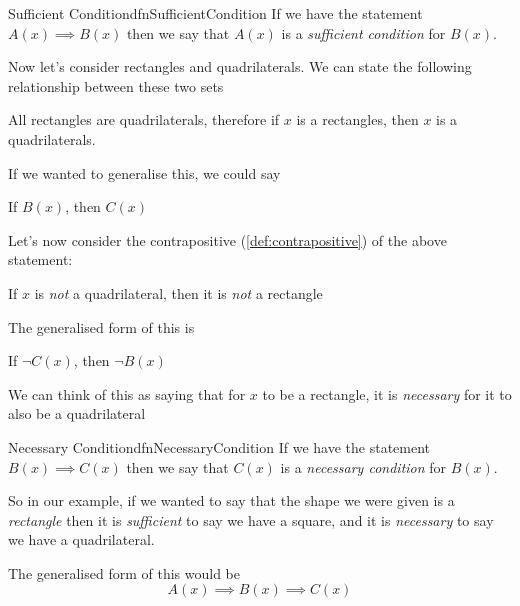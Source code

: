 \begin{dfn}[label={def:sufficentCondition}]{Sufficient Condition}{dfnSufficientCondition}
    If we have the statement $A(x) \implies B(x)$ then we say that $A(x)$ is a \emph{sufficient condition} for $B(x)$.
\end{dfn}

Now let's consider rectangles and quadrilaterals. We can state the following relationship between these two sets
\begin{center}
    All rectangles are quadrilaterals, therefore if $x$ is a rectangles, then $x$ is a quadrilaterals.
\end{center}

If we wanted to generalise this, we could say
\begin{center}
    If $B(x)$, then $C(x)$
\end{center}

Let's now consider the contrapositive (\cref{def:contrapositive}) of the above statement:
\begin{center}
    If $x$ is \emph{not} a quadrilateral, then it is \emph{not} a rectangle
\end{center}

The generalised form of this is
\begin{center}
    If $\lnot C(x)$, then $\lnot B(x)$
\end{center}

We can think of this as saying that for $x$ to be a rectangle, it is \emph{necessary} for it to also be a quadrilateral

\begin{dfn}[label={def:necessaryCondition}]{Necessary Condition}{dfnNecessaryCondition}
    If we have the statement $B(x) \implies C(x)$ then we say that $C(x)$ is a \emph{necessary condition} for $B(x)$.
\end{dfn}

So in our example, if we wanted to say that the shape we were given is a \emph{rectangle} then it is \emph{sufficient} to say we have a square, and it is \emph{necessary} to say we have a quadrilateral.

The generalised form of this would be
$$A(x) \implies B(x) \implies C(x)$$